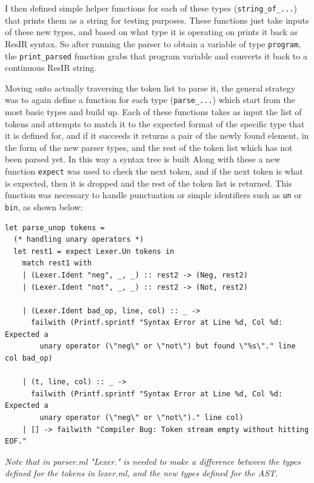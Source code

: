 \documentclass[11pt, a4paper]{article}
\begin{document}
\medskip

I then defined simple helper functions for each of these types (\texttt{string\_of\_...}) that prints them as a string for testing purposes. These functions just take inputs of these new types, 
and based on what type it is operating on prints it back as ResIR syntax. So after running the parser to obtain a variable of type \texttt{program}, the 
\texttt{print\_parsed} function grabs that program variable and converts it back to a continuous ResIR string.

\medskip

Moving onto actually traversing the token list to parse it, the general strategy was to again define a function for each type (\texttt{parse\_...}) which start from the most basic types and build up. 
Each of these functions takes as input the list of tokens and attempts to match it to the expected format of the specific type that it is defined for, and if it succeeds it returns a pair of the newly found 
element, in the form of the new parser types, and the rest of the token list which has not been parsed yet. In this way a syntax tree is built 
Along with these a new function \texttt{expect} was used to check the next token, and if the next token is what is expected, then it is dropped and the rest of the token list is returned. This function 
was necessary to handle punctuation or simple identifiers such as \texttt{un} or \texttt{bin}, as shown below:

\medskip

\begin{lstlisting}[language={[Objective]Caml}]
let parse_unop tokens =
  (* handling unary operators *)
  let rest1 = expect Lexer.Un tokens in
    match rest1 with
    | (Lexer.Ident "neg", _, _) :: rest2 -> (Neg, rest2)
    | (Lexer.Ident "not", _, _) :: rest2 -> (Not, rest2)

    | (Lexer.Ident bad_op, line, col) :: _ ->
      failwith (Printf.sprintf "Syntax Error at Line %d, Col %d: Expected a 
        unary operator (\"neg\" or \"not\") but found \"%s\"." line col bad_op)

    | (t, line, col) :: _ -> 
      failwith (Printf.sprintf "Syntax Error at Line %d, Col %d: Expected a 
        unary operator (\"neg\" or \"not\")." line col)
    | [] -> failwith "Compiler Bug: Token stream empty without hitting EOF."
\end{lstlisting}
\vspace{-1.2em}
\begin{center}
    \textit{\footnotesize Note that in parser.ml "Lexer." is needed to make a difference between the types defined for the tokens in lexer.ml, and the new types defined for the AST.}
\end{center}
\end{document}
